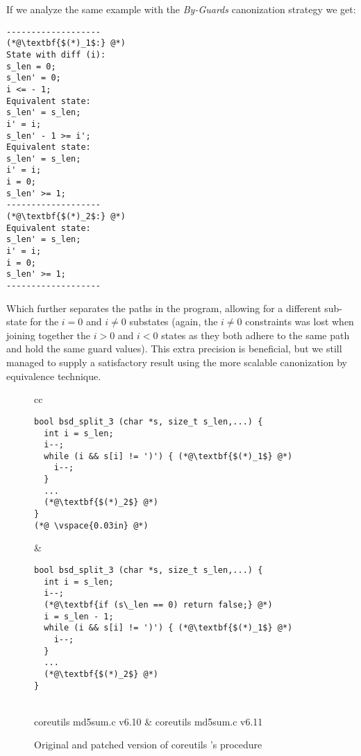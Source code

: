 If we analyze the same example with the \emph{By-Guards} canonization strategy we get:
\begin{lstlisting}
-------------------
(*@\textbf{$(*)_1$:} @*)
State with diff (i):
s_len = 0;
s_len' = 0;
i <= - 1;
Equivalent state:
s_len' = s_len;
i' = i;
s_len' - 1 >= i';
Equivalent state:
s_len' = s_len;
i' = i;
i = 0;
s_len' >= 1;
-------------------
(*@\textbf{$(*)_2$:} @*)
Equivalent state:
s_len' = s_len;
i' = i;
i = 0;
s_len' >= 1;
-------------------
\end{lstlisting}
Which further separates the paths in the program, allowing for a different sub-state for the $i = 0$ and $i \neq 0$ substates (again, the $i \neq 0$ constraints was lost when joining together the $i > 0$ and $i < 0$ states as they both adhere to the same path and hold the same guard values). This extra precision is beneficial, but we still managed to supply a satisfactory result using the more scalable canonization by equivalence technique.

\begin{figure*}
\centering
\begin{tabular}{cc}
\begin{lstlisting}
bool bsd_split_3 (char *s, size_t s_len,...) {
  int i = s_len;
  i--;
  while (i && s[i] != ')') { (*@\textbf{$(*)_1$} @*)
    i--;
  }
  ...
  (*@\textbf{$(*)_2$} @*)
}
(*@ \vspace{0.03in} @*)
\end{lstlisting}
&
\begin{lstlisting}
bool bsd_split_3 (char *s, size_t s_len,...) {
  int i = s_len;
  i--;
  (*@\textbf{if (s\_len == 0) return false;} @*)
  i = s_len - 1;
  while (i && s[i] != ')') { (*@\textbf{$(*)_1$} @*)
    i--;
  }
  ...
  (*@\textbf{$(*)_2$} @*)
}
\end{lstlisting}
\\
coreutils md5sum.c v6.10 & coreutils md5sum.c v6.11
\end{tabular}
\caption{Original and patched version of coreutils 's  procedure}
\end{figure*}

